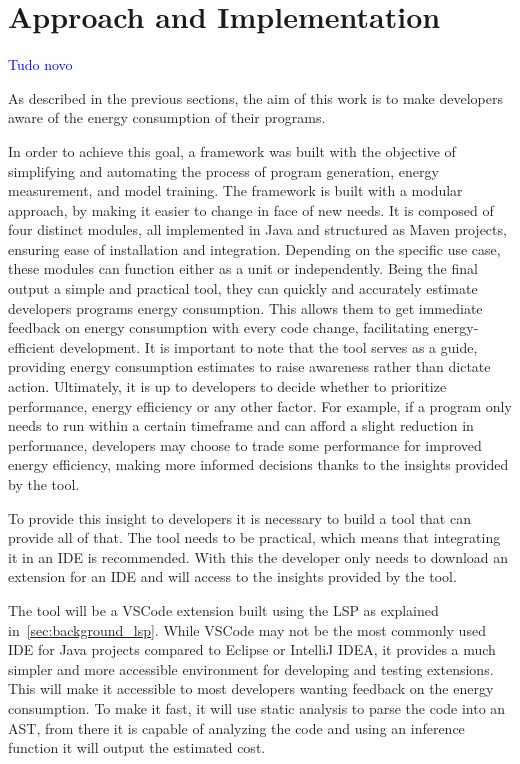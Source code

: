 \chapter{Approach and Implementation}\label{chapter:approach} \textcolor{blue}{Tudo novo}


As described in the previous sections, the aim of this work is to make developers aware of the energy consumption of their programs. 

In order to achieve this goal, a framework was built with the objective of simplifying and automating the process of program generation, energy measurement, and model training. The framework is built with a modular approach, by making it easier to change in face of new needs. It is composed of four distinct modules, all implemented in Java and structured as Maven projects, ensuring ease of installation and integration. Depending on the specific use case, these modules can function either as a unit or independently. Being the final output a simple and practical tool, they can quickly and accurately estimate developers programs energy consumption. This allows them to get immediate feedback on energy consumption with every code change, facilitating energy-efficient development. 
It is important to note that the tool serves as a guide, providing energy consumption estimates to raise awareness rather than dictate action. Ultimately, it is up to developers to decide whether to prioritize performance, energy efficiency or any other factor. For example, if a program only needs to run within a certain timeframe and can afford a slight reduction in performance, developers may choose to trade some performance for improved energy efficiency, making more informed decisions thanks to the insights provided by the tool.

To provide this insight to developers it is necessary to build a tool that can provide all of that. The tool needs to be practical, which means that integrating it in an IDE is recommended. With this the developer only needs to download an extension for an IDE and will access to the insights provided by the tool.

The tool will be a VSCode extension built using the LSP as explained in~\ref{sec:background_lsp}. While VSCode may not be the most commonly used IDE for Java projects compared to Eclipse or IntelliJ IDEA, it provides a much simpler and more accessible environment for developing and testing extensions. This will make it accessible to most developers wanting feedback on the energy consumption. To make it fast, it will use static analysis to parse the code into an AST, from there it is capable of analyzing the code and using an inference function it will output the estimated cost.


